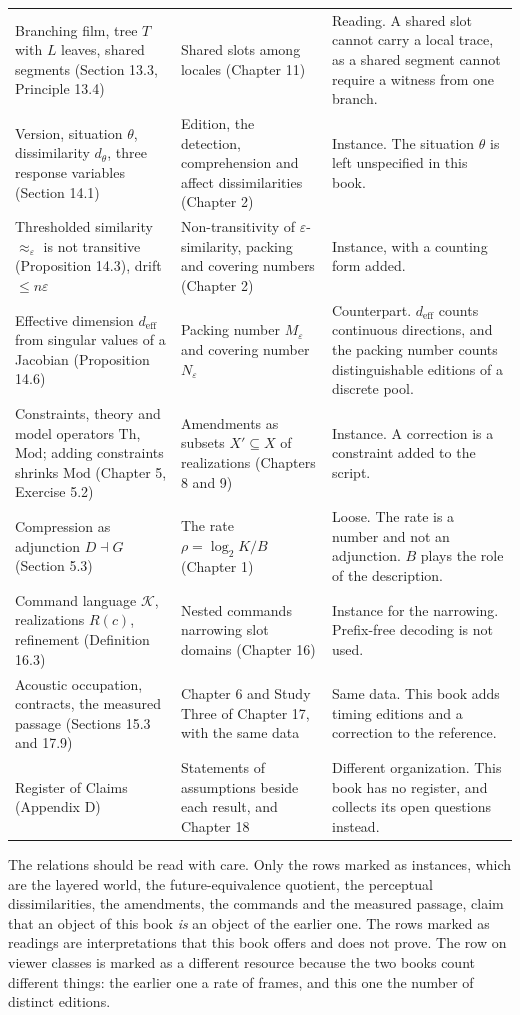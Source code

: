 \documentclass[11pt,twoside,openright]{book}
\theoremstyle{plain}
\theoremstyle{definition}
\theoremstyle{remark}
\begin{document}
\begin{longtable}{@{}>{\raggedright\arraybackslash}p{3.7cm}>{\raggedright\arraybackslash}p{3.7cm}>{\raggedright\arraybackslash}p{5.1cm}@{}}
Branching film, tree $T$ with $L$ leaves, shared segments (Section 13.3, Principle 13.4) & Shared slots among locales (Chapter 11) & Reading. A shared slot cannot carry a local trace, as a shared segment cannot require a witness from one branch.\\
Version, situation $\theta$, dissimilarity $d_\theta$, three response variables (Section 14.1) & Edition, the detection, comprehension and affect dissimilarities (Chapter 2) & Instance. The situation $\theta$ is left unspecified in this book.\\
Thresholded similarity $\approx_\varepsilon$ is not transitive (Proposition 14.3), drift $\le n\varepsilon$ & Non-transitivity of $\varepsilon$-similarity, packing and covering numbers (Chapter 2) & Instance, with a counting form added.\\
Effective dimension $d_{\mathrm{eff}}$ from singular values of a Jacobian (Proposition 14.6) & Packing number $M_\varepsilon$ and covering number $N_\varepsilon$ & Counterpart. $d_{\mathrm{eff}}$ counts continuous directions, and the packing number counts distinguishable editions of a discrete pool.\\
Constraints, theory and model operators $\mathrm{Th}$, $\mathrm{Mod}$; adding constraints shrinks $\mathrm{Mod}$ (Chapter 5, Exercise 5.2) & Amendments as subsets $X'\subseteq X$ of realizations (Chapters 8 and 9) & Instance. A correction is a constraint added to the script.\\
Compression as adjunction $D\dashv G$ (Section 5.3) & The rate $\rho=\log_2K/B$ (Chapter 1) & Loose. The rate is a number and not an adjunction. $B$ plays the role of the description.\\
Command language $\mathcal K$, realizations $R(c)$, refinement (Definition 16.3) & Nested commands narrowing slot domains (Chapter 16) & Instance for the narrowing. Prefix-free decoding is not used.\\
Acoustic occupation, contracts, the measured passage (Sections 15.3 and 17.9) & Chapter 6 and Study Three of Chapter 17, with the same data & Same data. This book adds timing editions and a correction to the reference.\\
Register of Claims (Appendix D) & Statements of assumptions beside each result, and Chapter 18 & Different organization. This book has no register, and collects its open questions instead.\\
\end{longtable}

The relations should be read with care. Only the rows marked as instances, which are the layered world, the future-equivalence quotient, the perceptual dissimilarities, the amendments, the commands and the measured passage, claim that an object of this book \emph{is} an object of the earlier one. The rows marked as readings are interpretations that this book offers and does not prove. The row on viewer classes is marked as a different resource because the two books count different things: the earlier one a rate of frames, and this one the number of distinct editions.
\end{document}
